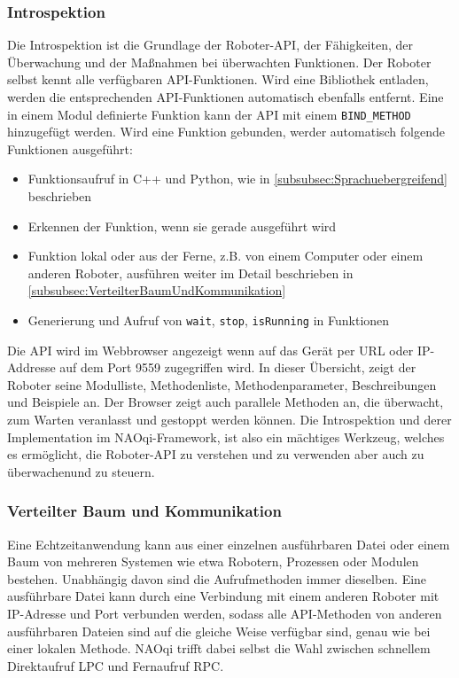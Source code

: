 \subsubsection{Introspektion}
\label{subsubsec:Introspektion}
Die Introspektion ist die Grundlage der Roboter-\ac{API}, der Fähigkeiten, der Überwachung und der Maßnahmen bei überwachten Funktionen. Der Roboter selbst kennt alle verfügbaren \ac{API}-Funktionen. Wird eine Bibliothek entladen, werden die entsprechenden \ac{API}-Funktionen automatisch ebenfalls entfernt. Eine in einem Modul definierte Funktion kann der \ac{API} mit einem \texttt{BIND\_METHOD} hinzugefügt werden.
Wird eine Funktion gebunden, werder automatisch folgende Funktionen ausgeführt:
\begin{itemize}
    \item Funktionsaufruf in C++ und Python, wie in \autoref{subsubsec:Sprachuebergreifend} beschrieben
    \item Erkennen der Funktion, wenn sie gerade ausgeführt wird
    \item Funktion lokal oder aus der Ferne, z.B. von einem Computer oder einem anderen Roboter, ausführen weiter im Detail beschrieben in \autoref{subsubsec:VerteilterBaumUndKommunikation}
    \item Generierung und Aufruf von \texttt{wait}, \texttt{stop}, \texttt{isRunning} in Funktionen
\end{itemize}
Die \ac{API} wird im Webbrowser angezeigt wenn auf das Gerät per \ac{URL} oder \ac{IP}-Addresse auf dem Port 9559 zugegriffen wird. In dieser Übersicht, zeigt der Roboter seine Modulliste, Methodenliste, Methodenparameter, Beschreibungen und Beispiele an. Der Browser zeigt auch parallele Methoden an, die überwacht, zum Warten veranlasst und gestoppt werden können.
Die Introspektion und derer Implementation im NAOqi-Framework, ist also ein mächtiges Werkzeug, welches es ermöglicht, die Roboter-\ac{API} zu verstehen und zu verwenden aber auch zu überwachenund zu steuern.

\subsubsection{Verteilter Baum und Kommunikation}
\label{subsubsec:VerteilterBaumUndKommunikation}
Eine Echtzeitanwendung kann aus einer einzelnen ausführbaren Datei oder einem Baum von mehreren Systemen wie etwa Robotern, Prozessen oder Modulen bestehen. Unabhängig davon sind die Aufrufmethoden immer dieselben. Eine ausführbare Datei kann durch eine Verbindung mit einem anderen Roboter mit \ac{IP}-Adresse und Port verbunden werden, sodass alle \ac{API}-Methoden von anderen ausführbaren Dateien sind auf die gleiche Weise verfügbar sind, genau wie bei einer lokalen Methode. NAOqi trifft dabei selbst die Wahl zwischen schnellem Direktaufruf \ac{LPC} und Fernaufruf \ac{RPC}.

